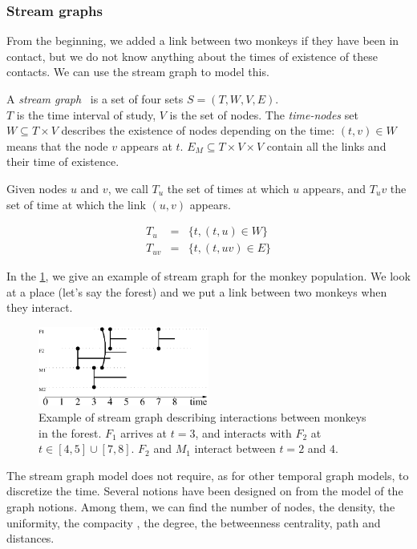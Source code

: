 \documentclass{svproc}
\begin{document}
\subsubsection{Stream graphs}
From the beginning, we added a link between two monkeys if they have been in contact, but we do not know anything about the times of existence of these contacts. We can use the stream graph to model this.

A {\em stream graph}~\cite{stream} is a set of four sets $S=(T,W,V,E)$.\\
$T$ is the time interval of study, $V$ is the set of nodes. The {\em time-nodes} set $W \subseteq T \times V$ describes the existence of nodes depending on the time: $(t,v) \in W$ means that the node $v$ appears at $t$. $E_M \subseteq T \times V \times V$ contain all the links and their time of existence.

Given nodes $u$ and $v$, we call $T_u$ the set of times at which $u$ appears, and $T_uv$ the set of time at which the link $(u,v)$ appears.

\begin{equation}
\begin{array}{rcl}
T_u&=&\{t, (t,u) \in W \}\\
T_{uv}&=&\{t, (t,uv)\in E \} 
\end{array}
\end{equation}

In the \cref{exmonkeystream}, we give an example of stream graph for the monkey population. We look at a place (let's say the forest) and we put a link between two monkeys when they interact.

\begin{figure}
\centering
	\includegraphics[width=0.5\textwidth]{img/ext.pdf}
	\caption{Example of stream graph describing interactions between monkeys in the forest. $F_1$ arrives at $t=3$, and interacts with $F_2$ at $t \in[4,5]\cup [7,8]$. $F_2$ and $M_1$ interact between $t=2$ and $4$.}
	\label{exmonkeystream}
\end{figure}

The stream graph model does not require, as for other temporal graph models, to discretize the time. Several notions have been designed on \cite{stream} from the model of the graph notions. Among them, we can find the number of nodes, the density, the uniformity, the compacity , the degree, the betweenness centrality, path and distances.
\end{document}
